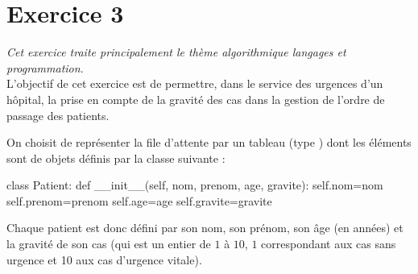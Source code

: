 \documentclass[11pt,a4paper,french,twoside]{PMCours}
\begin{document}
\newpage\noindent
\section*{Exercice 3}
\emph{Cet exercice traite principalement le thème \og{} algorithmique
langages et programmation\fg{}.}\medskip\\

L'objectif de cet exercice est de permettre, dans le service des urgences
d'un hôpital, la prise en compte de la gravité des cas dans la gestion
de l'ordre de passage des patients.

\medskip
On choisit de représenter la file d'attente par un tableau (type )
dont les éléments sont de objets définis par la classe suivante :
\begin{Python}
class Patient:
    def __init__(self, nom, prenom, age, gravite):
        self.nom=nom
        self.prenom=prenom
        self.age=age
        self.gravite=gravite
\end{Python}
Chaque patient est donc défini par son nom, son prénom, son âge (en années)
et la gravité de son cas (qui est un entier de $1$ à $10$, $1$ correspondant
aux cas sans urgence et 10 aux cas d'urgence vitale).
\end{document}
